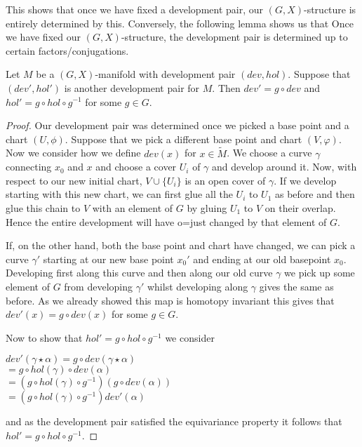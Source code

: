 This shows that once we have fixed a development pair, our $(G,X)$-structure is
entirely determined by this. Conversely, the following lemma shows us that Once
we have fixed our $(G,X)$-structure, the development pair is determined up to
certain factors/conjugations.

\begin{lemma}
    Let $M$ be a $(G,X)$-manifold with development pair $(dev, hol)$. Suppose that $(dev', hol')$ is
    another development pair for $M$. Then $dev' = g\circ dev$ and $hol' = g\circ hol \circ g^{-1}$
    for some $g \in G$. \label{lemma:equivalent-dev-pair}
\end{lemma}
\begin{proof}
    Our development pair was determined once we picked a base point and a chart $(U, \phi)$. Suppose that
    we pick a different base point and chart $(V, \varphi)$. Now we consider how we define $dev(x)$ for $x \in \tilde{M}$.
    We choose a curve $\gamma$ connecting $x_0$ and $x$ and choose a cover $U_i$ of $\gamma$ and develop around it.
    Now, with respect to our new initial chart, $V \cup \{U_i\}$ is an open cover of $\gamma$. If we develop starting with this new chart,
    we can first glue all the $U_i$ to $U_1$ as before and then glue this chain to $V$ with an element of $G$ by gluing
    $U_1$ to $V$ on their overlap. Hence the entire development will have o=just changed by that element of $G$.

    If, on the other hand, both the base point and chart have changed, we can pick
    a curve $\gamma'$ starting at our new base point $x_0'$ and ending at our old
    basepoint $x_0$. Developing first along this curve and then along our old curve
    $\gamma$ we pick up some element of $G$ from developing $\gamma'$ whilst
    developing along $\gamma$ gives the same as before. As we already showed this
    map is homotopy invariant this gives that $dev'(x) = g\circ dev(x)$ for some $g
        \in G$.

    Now to show that $hol' = g\circ hol \circ g^{-1}$ we consider
    \begin{center}
        $dev'(\gamma \star \alpha) = g \circ dev(\gamma \star \alpha)$\\
        $= g\circ hol(\gamma) \circ dev(\alpha)$\\
        $= (g\circ hol(\gamma)\circ g^{-1})(g\circ dev(\alpha))$\\
        $= (g \circ hol(\gamma)\circ g^{-1})dev'(\alpha)$
    \end{center}
    and as the development pair satisfied the equivariance property it follows that
    $hol' = g\circ hol \circ g^{-1}$.
\end{proof}

